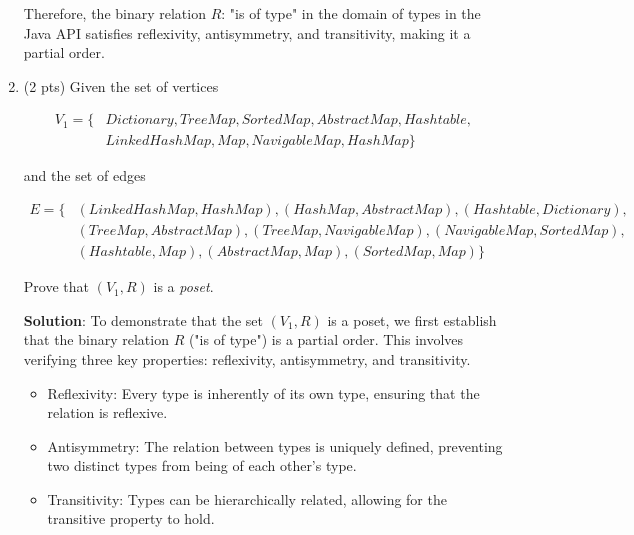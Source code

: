 \documentclass[12pt]{article}
\begin{document}
\begin{spacing}{1.5}
\begin{enumerate}
		      Therefore, the binary relation $R$: "is of type" in the domain of types in the Java API satisfies reflexivity, antisymmetry, and transitivity, making it a partial order. 
		      		      		      
		\item (2 pts) Given the set of vertices
		      		      		      
		      \begin{align*}
		      	V_1= \{ & Dictionary, TreeMap, SortedMap, AbstractMap, Hashtable, \\
		      	        & LinkedHashMap, Map, NavigableMap, HashMap\}             
		      \end{align*}
		      		      		              
		      and the set of edges
		      		      		      
		      \begin{align*}
		      	E = \{ & (LinkedHashMap, HashMap), (HashMap, AbstractMap), (Hashtable, Dictionary),  \\
		      	       & (TreeMap, AbstractMap), (TreeMap, NavigableMap), (NavigableMap, SortedMap), \\
		      	       & (Hashtable, Map), (AbstractMap, Map), (SortedMap, Map) \}                   
		      \end{align*}
		      		      		      
		      Prove that $(V_1, R)$ is a \textit{poset}.
		      		      		      
		      \textbf{Solution}:  To demonstrate that the set $(V_1, R)$ is a poset, we first establish that the binary relation $R$ ("is of type") is a partial order. This involves verifying three key properties: reflexivity, antisymmetry, and transitivity.
		      		      
		      \begin{itemize}
		      	\item Reflexivity: Every type is inherently of its own type, ensuring that the relation is reflexive.
		      	      		      	              
		      	\item Antisymmetry: The relation between types is uniquely defined, preventing two distinct types from being of each other's type.
		      	      		      	              
		      	\item Transitivity: Types can be hierarchically related, allowing for the transitive property to hold.
		      	      		      	              

\end{itemize}
\end{enumerate}
\end{spacing}
\end{document}
